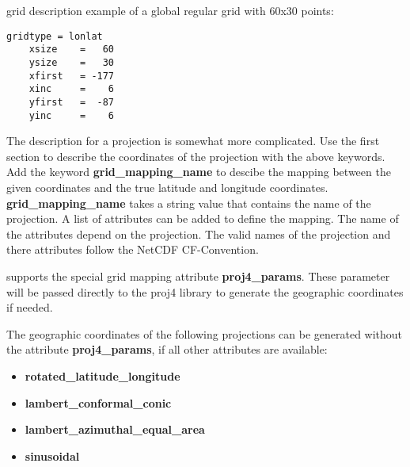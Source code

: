 \vspace{2mm}

{\CDO} grid description example of a global regular grid with 60x30 points:
\begin{lstlisting}[frame=single, backgroundcolor=\color{pcolor1}, basicstyle=\footnotesize]
    gridtype = lonlat
    xsize    =   60
    ysize    =   30
    xfirst   = -177
    xinc     =    6
    yfirst   =  -87
    yinc     =    6
\end{lstlisting}



\vspace{2mm}

The description for a projection is somewhat more complicated.
Use the first section to describe the coordinates of the projection with the above keywords.
Add the keyword \textbf{grid\_mapping\_name} to descibe the mapping between the given coordinates and the true
latitude and longitude coordinates. \textbf{grid\_mapping\_name} takes a string
value that contains the name of the projection. A list of attributes can be added to define the mapping.
The name of the attributes depend on the projection. The valid names
of the projection and there attributes follow the NetCDF CF-Convention.

{\CDO} supports the special grid mapping attribute \textbf{proj4\_params}. 
These parameter will be passed directly to the proj4 library to
generate the geographic coordinates if needed.

The geographic coordinates of the following projections can be
generated without the attribute \textbf{proj4\_params}, if all other
attributes are available:

\begin{itemize}
\item \textbf{rotated\_latitude\_longitude}
\item \textbf{lambert\_conformal\_conic}
\item \textbf{lambert\_azimuthal\_equal\_area}
\item \textbf{sinusoidal}
\end{itemize}

